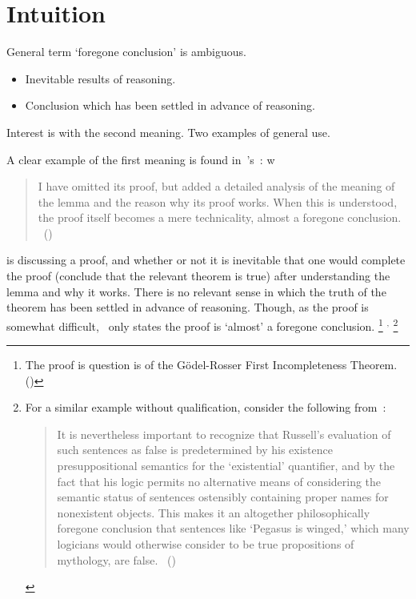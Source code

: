 \section{Intuition}
\label{sec:intuition}

\begin{note}
  General term `foregone conclusion' is ambiguous.
  \begin{itemize}
    \item
    Inevitable results of reasoning.
  \item
    Conclusion which has been settled in advance of reasoning.
  \end{itemize}

  Interest is with the second meaning.
  Two examples of general use.

  A clear example of the first meaning is found in~\citeauthor{Machover:1996vu}'s~:
w
  \begin{quote}
    I have omitted its proof, but added a detailed analysis of the meaning of the lemma and the reason why its proof works. When this is understood, the proof itself becomes a mere technicality, almost a foregone conclusion.%
    \mbox{ }\hfill\mbox{(\citeyear[viii]{Machover:1996vu})}
  \end{quote}

  \citeauthor{Machover:1996vu} is discussing a proof, and whether or not it is inevitable that one would complete the proof (conclude that the relevant theorem is true) after understanding the lemma and why it works.
  There is no relevant sense in which the truth of the theorem has been settled in advance of reasoning.
  Though, as the proof is somewhat difficult,~\citeauthor{Machover:1996vu} only states the proof is `almost' a foregone conclusion.%
  \footnote{
    The proof is question is of the G\"{o}del-Rosser First Incompleteness Theorem.
    (\citeyear[Cf.][226]{Machover:1996vu})
  }%
  \(^{,}\)
  \footnote{
    For a similar example without qualification, consider the following from~\textcite{Jacquette:2002up}:
    \begin{quote}
    It is nevertheless important to recognize that Russell's evaluation of such sentences as false is predetermined by his existence presuppositional semantics for the ‘existential' quantifier, and by the fact that his logic permits no alternative means of considering the semantic status of sentences ostensibly containing proper names for nonexistent objects.
    This makes it an altogether philosophically foregone conclusion that sentences like ‘Pegasus is winged,' which many logicians would otherwise consider to be true propositions of mythology, are false.%
    \mbox{ }\hfill\mbox{(\citeyear[6]{Jacquette:2002up})}
  \end{quote}
  }


\end{note}
